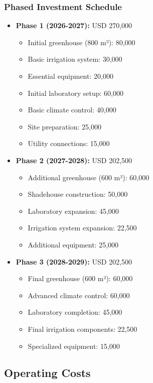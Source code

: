 \subsubsection{Phased Investment Schedule}
\begin{itemize}
    \item \textbf{Phase 1 (2026-2027):} USD 270,000
    \begin{itemize}
        \item Initial greenhouse (800 m²): 80,000
        \item Basic irrigation system: 30,000
        \item Essential equipment: 20,000
        \item Initial laboratory setup: 60,000
        \item Basic climate control: 40,000
        \item Site preparation: 25,000
        \item Utility connections: 15,000
    \end{itemize}
    
    \item \textbf{Phase 2 (2027-2028):} USD 202,500
    \begin{itemize}
        \item Additional greenhouse (600 m²): 60,000
        \item Shadehouse construction: 50,000
        \item Laboratory expansion: 45,000
        \item Irrigation system expansion: 22,500
        \item Additional equipment: 25,000
    \end{itemize}
    
    \item \textbf{Phase 3 (2028-2029):} USD 202,500
    \begin{itemize}
        \item Final greenhouse (600 m²): 60,000
        \item Advanced climate control: 60,000
        \item Laboratory completion: 45,000
        \item Final irrigation components: 22,500
        \item Specialized equipment: 15,000
    \end{itemize}
\end{itemize}
 
\subsection{Operating Costs}

